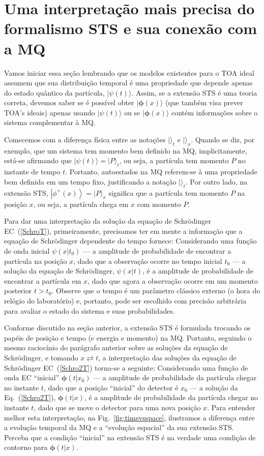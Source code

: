 \section{Uma interpretação mais precisa do formalismo STS e sua conexão com a MQ}
\label{sec:interpretando}

Vamos iniciar essa seção lembrando que os modelos existentes para o TOA ideal assumem que sua distribuição temporal é uma propriedade que depende apenas do estado quântico da partícula, $|\psi(t)\rangle$. Assim, se a extensão STS é uma teoria correta, devemos saber se é possível obter $|\pmb{\phi}(x)\rangle$ (que também visa prever TOA's ideais) apenas usando $|\psi(t )\rangle$ ou se $|\pmb{\phi}(x)\rangle$ contém informações sobre o sistema complementar à MQ.

Comecemos com a diferença física entre as notações $|\rangle_t$ e $|\rangle_x$. Quando se diz, por exemplo, que um sistema tem momento bem definido na MQ, implicitamente, está-se afirmando que $|\psi(t)\rangle=|P\rangle_t$, ou seja, a partícula tem momento $P$ no instante de tempo $t$. Portanto, autoestados na MQ referem-se à uma propriedade bem definida em um tempo fixo, justificando a notação $|\rangle_t$. Por outro lado, na extensão STS, $\left|\phi^{+}(x)\right\rangle=|P\rangle_x$ significa que a partícula tem momento $P$ na posição $x$, ou seja, a partícula chega em $x$ com momento $P$.


Para dar uma interpretação da solução da equação de Schrödinger EC~(\ref{SchroT}), primeiramente, precisamos ter em mente a informação que a equação de Schrödinger dependente do tempo fornece: Considerando uma função de onda inicial $ \psi(x|t_0)$ --- a amplitude de probabilidade de encontrar a partícula na posição $x$, dado que a observação ocorre no tempo inicial $t_0$ --- a solução da equação de Schrödinger, $\psi(x|t)$, é a amplitude de probabilidade de encontrar a partícula em $x$, dado que agora a observação ocorre em um momento posterior $t>t_0$. Observe que o tempo é um parâmetro clássico externo (o hora do relógio do laboratório) e, portanto, pode ser escolhido com precisão arbitrária para avaliar o estado do sistema e suas probabilidades.


Conforme discutido na seção anterior, a extensão STS é formulada trocando os papéis de posição e tempo (e energia e momento) na MQ. Portanto, seguindo o mesmo raciocínio do parágrafo anterior sobre as soluções da equação de Schrödinger, e tomando $x \rightleftarrows t$, a interpretação das soluções da equação de Schrödinger EC~(\ref{Schro2T}) torna-se a seguinte: Considerando uma função de onda EC ``inicial'' $\pmb{\phi}(t|x_0)$ --- a amplitude de probabilidade da partícula chegar no instante $t$, dado que a posição ``inicial'' do detector é $x_0$ --- a solução da Eq.~(\ref{Schro2T}), $\pmb{\phi}(t| x)$, é a amplitude de probabilidade da partícula chegar no instante $t$, dado que se move o detector para uma nova posição $x$. Para entender melhor esta interpretação, na Fig.~\ref{fig:timevsspace}, ilustramos a diferença entre a evolução temporal da MQ e a ``evolução espacial'' da sua extensão STS. Perceba que a condição ``inicial'' na extensão STS é na verdade uma condição de contorno para $\pmb{\phi}(t|x)$.

